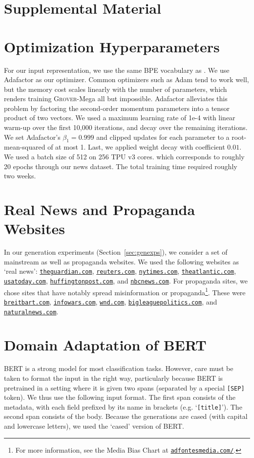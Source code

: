\documentclass{article}
\newcommand{\modelname}{{\textsc{Grover}}}
\begin{document}



\appendix
\clearpage
\section*{Supplemental Material}
\section{Optimization Hyperparameters}
\label{sec:optimizationhyperparameters}
For our input representation, we use the same BPE vocabulary as \citep{radford2019gpttwo}. We use Adafactor \citep{shazeer2018adafactor} as our optimizer. Common optimizers such as Adam \citep{Kingma2014AdamAM} tend to work well, but the memory cost scales linearly with the number of parameters, which renders training \modelname-Mega all but impossible. Adafactor alleviates this problem by factoring the second-order momentum parameters into a tensor product of two vectors. We used a maximum learning rate of 1e-4 with linear warm-up over the first 10,000 iterations, and decay over the remaining iterations. We set Adafactor's $\beta_1=0.999$ and clipped updates for each parameter to a root-mean-squared of at most 1. Last, we applied weight decay with coefficient $0.01$. We used a batch size of 512 on 256 TPU v3 cores. which corresponds to roughly 20 epochs through our news dataset. The total training time required roughly two weeks.

\section{Real News and Propaganda Websites}
\label{sec:newssites}
\newcommand\fnl[1]{{\tt\small \href{https://#1}{#1}}}
In our generation experiments (Section~\ref{sec:genexps}), we consider a set of mainstream as well as propaganda websites. We used the following websites as `real news': \fnl{theguardian.com}, \fnl{reuters.com}, 
\fnl{nytimes.com},
\fnl{theatlantic.com},
\fnl{usatoday.com},
\fnl{huffingtonpost.com},
and 
\fnl{nbcnews.com}. 
For propaganda sites, we chose sites that have notably spread misinformation \citep{fakenewslist} or propaganda\footnote{For more information, see the Media Bias Chart at {\tt\scriptsize \href{https://www.adfontesmedia.com/}{adfontesmedia.com/}}.}. These were \fnl{breitbart.com}, \fnl{infowars.com}, \fnl{wnd.com}, \fnl{bigleaguepolitics.com}, and \fnl{naturalnews.com}.

\section{Domain Adaptation of BERT}
\label{sec:bertda}
BERT \citep{devlin2018bert} is a strong model for most classification tasks. However, care must be taken to format the input in the right way, particularly because BERT is pretrained in a setting where it is given two spans (separated by a special {\small\tt [SEP]} token). We thus use the following input format. The first span consists of the metadata, with each field prefixed by its name in brackets (e.g. `{\small\tt [title]}'). The second span consists of the body. Because the generations are cased (with capital and lowercase letters), we used the `cased' version of BERT.
\end{document}
